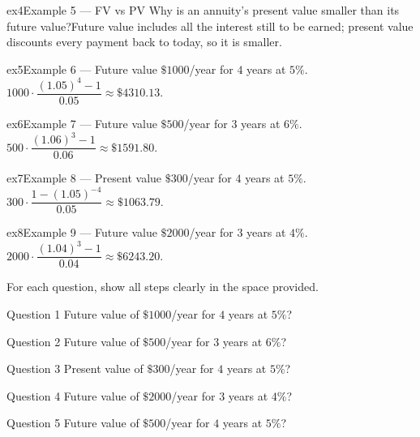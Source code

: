 \documentclass[11pt]{article}
\begin{document}
\begin{example}{ex4}{Example 5 --- FV vs PV}
Why is an annuity's present value smaller than its future value?\soln Future value includes all the interest still to be earned; present value discounts every payment back to today, so it is smaller.
\end{example}

\begin{example}{ex5}{Example 6 --- Future value}
$\$1000$/year for $4$ years at $5\%$.\soln $1000\cdot\dfrac{(1.05)^{4}-1}{0.05}\approx\$4310.13$.
\end{example}

\begin{example}{ex6}{Example 7 --- Future value}
$\$500$/year for $3$ years at $6\%$.\soln $500\cdot\dfrac{(1.06)^{3}-1}{0.06}\approx\$1591.80$.
\end{example}

\begin{example}{ex7}{Example 8 --- Present value}
$\$300$/year for $4$ years at $5\%$.\soln $300\cdot\dfrac{1-(1.05)^{-4}}{0.05}\approx\$1063.79$.
\end{example}

\begin{example}{ex8}{Example 9 --- Future value}
$\$2000$/year for $3$ years at $4\%$.\soln $2000\cdot\dfrac{(1.04)^{3}-1}{0.04}\approx\$6243.20$.
\end{example}

\clearpage
{}
For each question, show all steps clearly in the space provided.

\begin{qbox}{Question 1}
Future value of $\$1000$/year for $4$ years at $5\%$?\workspace{2.4cm}
\end{qbox}

\begin{qbox}{Question 2}
Future value of $\$500$/year for $3$ years at $6\%$?\workspace{2.4cm}
\end{qbox}

\begin{qbox}{Question 3}
Present value of $\$300$/year for $4$ years at $5\%$?\workspace{2.4cm}
\end{qbox}

\begin{qbox}{Question 4}
Future value of $\$2000$/year for $3$ years at $4\%$?\workspace{2.4cm}
\end{qbox}

\begin{qbox}{Question 5}
Future value of $\$500$/year for $4$ years at $5\%$?\workspace{2.4cm}
\end{qbox}
\end{document}
